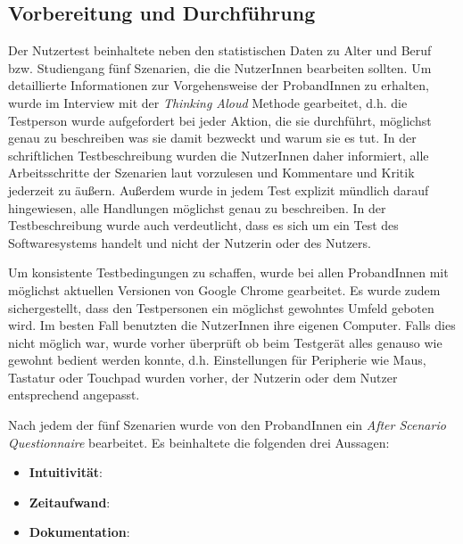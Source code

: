 \subsection{Vorbereitung und Durchführung}

Der Nutzertest beinhaltete neben den statistischen Daten zu Alter und Beruf bzw. Studiengang fünf Szenarien, die die NutzerInnen bearbeiten sollten. Um detaillierte Informationen zur Vorgehensweise der ProbandInnen zu erhalten, wurde im Interview mit der \textit{Thinking Aloud} Methode gearbeitet, d.h. die Testperson wurde aufgefordert bei jeder Aktion, die sie durchführt, möglichst genau zu beschreiben was sie damit bezweckt und warum sie es tut\cite{Nielsen1993}. In der schriftlichen Testbeschreibung wurden die NutzerInnen daher informiert, alle Arbeitsschritte der Szenarien laut vorzulesen und Kommentare und Kritik jederzeit zu äußern. Außerdem wurde in jedem Test explizit mündlich darauf hingewiesen, alle Handlungen möglichst genau zu beschreiben. In der Testbeschreibung wurde auch verdeutlicht, dass es sich um ein Test des Softwaresystems handelt und nicht der Nutzerin oder des Nutzers.

Um konsistente Testbedingungen zu schaffen, wurde bei allen ProbandInnen mit möglichst aktuellen Versionen von Google Chrome gearbeitet. Es wurde zudem sichergestellt, dass den Testpersonen ein möglichst gewohntes Umfeld geboten wird. Im besten Fall benutzten die NutzerInnen ihre eigenen Computer. Falls dies nicht möglich war, wurde vorher überprüft ob beim Testgerät alles genauso wie gewohnt bedient werden konnte, d.h. Einstellungen für Peripherie wie Maus, Tastatur oder Touchpad wurden vorher, der Nutzerin oder dem Nutzer entsprechend angepasst.

Nach jedem der fünf Szenarien wurde von den ProbandInnen ein \textit{After Scenario Questionnaire}\cite{Lewis1995} bearbeitet. Es beinhaltete die folgenden drei Aussagen:
\begin{itemize}
	\item \textbf{Intuitivität}: 
	\item \textbf{Zeitaufwand}: 
	\item \textbf{Dokumentation}: 
\end{itemize}

